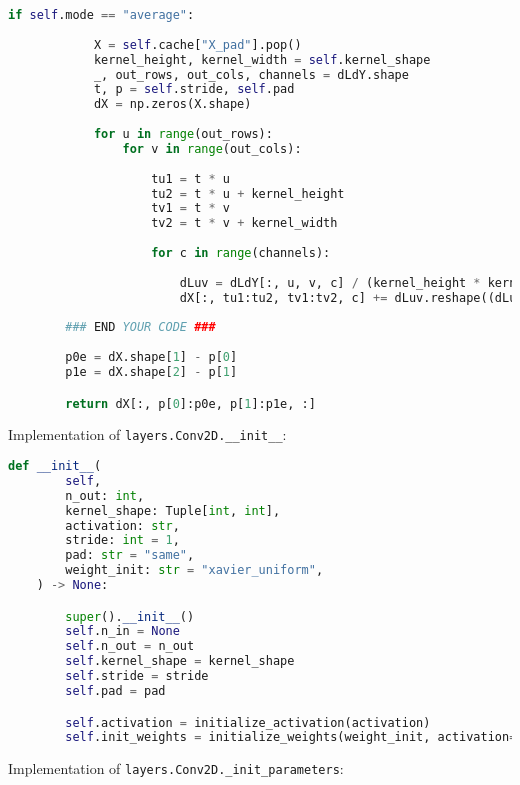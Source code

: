\begin{lstlisting}[language=Python]
        if self.mode == "average":
            
            X = self.cache["X_pad"].pop()
            kernel_height, kernel_width = self.kernel_shape
            _, out_rows, out_cols, channels = dLdY.shape
            t, p = self.stride, self.pad
            dX = np.zeros(X.shape)
            
            for u in range(out_rows):
                for v in range(out_cols):
                    
                    tu1 = t * u
                    tu2 = t * u + kernel_height
                    tv1 = t * v
                    tv2 = t * v + kernel_width
                        
                    for c in range(channels):
                        
                        dLuv = dLdY[:, u, v, c] / (kernel_height * kernel_width)
                        dX[:, tu1:tu2, tv1:tv2, c] += dLuv.reshape((dLuv.shape[0], 1, 1))
        
        ### END YOUR CODE ###
        
        p0e = dX.shape[1] - p[0]
        p1e = dX.shape[2] - p[1]

        return dX[:, p[0]:p0e, p[1]:p1e, :] 

\end{lstlisting}

Implementation of \texttt{layers.Conv2D.__init__}:

\begin{lstlisting}[language=Python]
    def __init__(
        self,
        n_out: int,
        kernel_shape: Tuple[int, int],
        activation: str,
        stride: int = 1,
        pad: str = "same",
        weight_init: str = "xavier_uniform",
    ) -> None:

        super().__init__()
        self.n_in = None
        self.n_out = n_out
        self.kernel_shape = kernel_shape
        self.stride = stride
        self.pad = pad

        self.activation = initialize_activation(activation)
        self.init_weights = initialize_weights(weight_init, activation=activation)

\end{lstlisting}

Implementation of \texttt{layers.Conv2D._init_parameters}:

